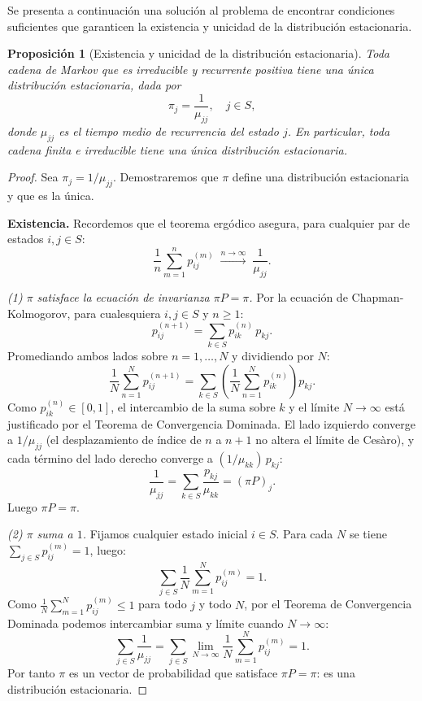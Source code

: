 \documentclass[12pt]{book}
\newtheorem{proposition}{Proposición}[chapter]
\begin{document}
Se presenta a continuación una solución al problema de encontrar condiciones suficientes que garanticen la existencia y unicidad de la distribución estacionaria.

\begin{proposition}[Existencia y unicidad de la distribución estacionaria]
    Toda cadena de Markov que es irreducible y recurrente positiva tiene una única distribución estacionaria, dada por
    \[
        \pi_j = \frac{1}{\mu_{jj}}, \quad j \in S,
    \]
    donde $\mu_{jj}$ es el tiempo medio de recurrencia del estado $j$. En particular, toda cadena finita e irreducible tiene una única distribución estacionaria.
\end{proposition}

\begin{proof}
    Sea $\pi_j = 1/\mu_{jj}$. Demostraremos que $\pi$ define una distribución estacionaria y que es la única.

    \medskip
    \textbf{Existencia.}
    Recordemos que el teorema ergódico asegura, para cualquier par de estados $i, j \in S$:
    \[
        \frac{1}{n}\sum_{m=1}^{n} p_{ij}^{(m)} \;\xrightarrow{n\to\infty}\; \frac{1}{\mu_{jj}}.
    \]

    \smallskip
    \textit{(1) $\pi$ satisface la ecuación de invarianza $\pi P = \pi$.}
    Por la ecuación de Chapman-Kolmogorov, para cualesquiera $i, j \in S$ y $n \ge 1$:
    \[
        p_{ij}^{(n+1)} = \sum_{k \in S} p_{ik}^{(n)}\, p_{kj}.
    \]
    Promediando ambos lados sobre $n = 1, \dots, N$ y dividiendo por $N$:
    \[
        \frac{1}{N}\sum_{n=1}^N p_{ij}^{(n+1)}
        = \sum_{k \in S} \left(\frac{1}{N}\sum_{n=1}^N p_{ik}^{(n)}\right) p_{kj}.
    \]
    Como $p_{ik}^{(n)} \in [0,1]$, el intercambio de la suma sobre $k$ y el límite $N \to \infty$ está justificado por el Teorema de Convergencia Dominada. El lado izquierdo converge a $1/\mu_{jj}$ (el desplazamiento de índice de $n$ a $n+1$ no altera el límite de Cesàro), y cada término del lado derecho converge a $(1/\mu_{kk})\,p_{kj}$:
    \[
        \frac{1}{\mu_{jj}} = \sum_{k \in S} \frac{p_{kj}}{\mu_{kk}} = (\pi P)_j.
    \]
    Luego $\pi P = \pi$.

    \smallskip
    \textit{(2) $\pi$ suma a $1$.}
    Fijamos cualquier estado inicial $i \in S$. Para cada $N$ se tiene $\sum_{j \in S} p_{ij}^{(m)} = 1$, luego:
    \[
        \sum_{j \in S} \frac{1}{N}\sum_{m=1}^N p_{ij}^{(m)} = 1.
    \]
    Como $\frac{1}{N}\sum_{m=1}^N p_{ij}^{(m)} \le 1$ para todo $j$ y todo $N$, por el Teorema de Convergencia Dominada podemos intercambiar suma y límite cuando $N \to \infty$:
    \[
        \sum_{j \in S} \frac{1}{\mu_{jj}} = \sum_{j \in S} \lim_{N\to\infty}\frac{1}{N}\sum_{m=1}^N p_{ij}^{(m)} = 1.
    \]
    Por tanto $\pi$ es un vector de probabilidad que satisface $\pi P = \pi$: es una distribución estacionaria.


\end{proof}
\end{document}
